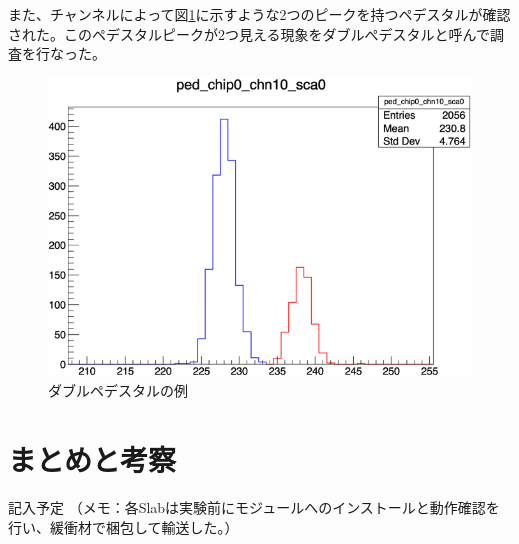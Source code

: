 また、チャンネルによって図\ref{dp}に示すような2つのピークを持つペデスタルが確認された。このペデスタルピークが2つ見える現象をダブルぺデスタルと呼んで調査を行なった。
\begin{figure}[H]
\begin{center}
 \includegraphics[keepaspectratio, scale=0.5]
 	{Figure/Beamtest/dp.png}
 		\caption{ダブルペデスタルの例}
		\label{dp}
\end{center}
\end{figure}
\section{まとめと考察}
記入予定
（メモ：各Slabは実験前にモジュールへのインストールと動作確認を行い、緩衝材で梱包して輸送した。）